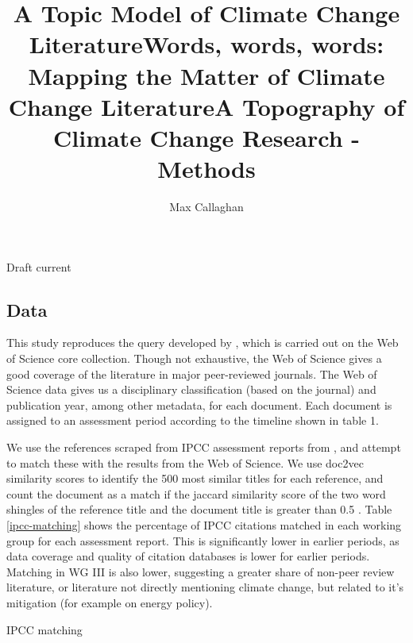 \documentclass{article}
\makeatletter
\renewcommand{\maketitle}{\bgroup\setlength{\parindent}{0pt}
	\begin{flushleft}
		
		{\huge\textbf{\@title}}
		
		\bigskip
		
		{\large\textbf{\@author}}
		
		\bigskip
		
		{\large{Draft current \@date}}
		
	\end{flushleft}\egroup
}
\makeatother
\begin{document}
	\title{A Topic Model of Climate Change Literature}
	\title{Words, words, words: Mapping the Matter of Climate Change Literature}
	\title{A Topography of Climate Change Research - Methods}
	\author[1,2]{Max Callaghan}
	
	\maketitle
	\begin{linenumbers}
	
	\setcounter{figure}{0}
	\renewcommand\thefigure{SI.\arabic{figure}}  
		
	\subsection*{Data}
	
	This study reproduces the query developed by \citep{Grieneisen2011}, which is carried out on the Web of Science core collection. Though not exhaustive, the Web of Science gives a good coverage of the literature in major peer-reviewed journals. The Web of Science data gives us a disciplinary classification (based on the journal) and publication year, among other metadata, for each document.	Each document is assigned to an assessment period according to the timeline shown in table 1.
	
	We use the references scraped from IPCC assessment reports from \citep{Minx2017l}, and attempt to match these with the results from the Web of Science. We use doc2vec similarity scores \cite{Le2014} to identify the 500 most similar titles for each reference, and count the document as a match if the jaccard similarity score of the two word shingles of the reference title and the document title is greater than 0.5 \cite{Khabsa2014}. Table \ref{ipcc-matching} shows the percentage of IPCC citations matched in each working group for each assessment report. This is significantly lower in earlier periods, as data coverage and quality of citation databases is lower for earlier periods. Matching in WG III is also lower, suggesting a greater share of non-peer review literature, or literature not directly mentioning climate change, but related to it's mitigation (for example on energy policy).
	
		\begin{table}[htp]
			\begin{center}
		
	\caption{IPCC matching}
	\label{ipcc-matching}
	\end{center}
\end{table}
	

\end{linenumbers}
\end{document}
